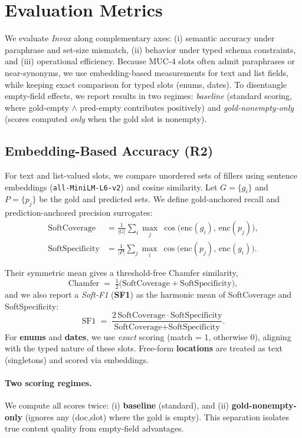 \section{Evaluation Metrics}
\label{sec:eval-metrics}

We evaluate \textit{Invox} along complementary axes: (i) semantic accuracy under paraphrase and set-size mismatch, (ii) behavior under typed schema constraints, and (iii) operational efficiency. 
Because MUC-4 slots often admit paraphrases or near-synonyms, we use embedding-based measurements for text and list fields, while keeping exact comparison for typed slots (enums, dates).
To disentangle empty-field effects, we report results in two regimes:
\emph{baseline} (standard scoring, where gold-empty $\wedge$ pred-empty contributes positively) and 
\emph{gold-nonempty-only} (scores computed \emph{only} when the gold slot is nonempty).

\subsection{Embedding-Based Accuracy (R2)}
\label{subsec:emb-acc}

For text and list-valued slots, we compare unordered sets of fillers using sentence embeddings (\texttt{all-MiniLM-L6-v2}) and cosine similarity. 
Let $G=\{g_i\}$ and $P=\{p_j\}$ be the gold and predicted sets. 
We define gold-anchored recall and prediction-anchored precision surrogates:
\begin{align}
\text{SoftCoverage}   &= \frac{1}{|G|}\sum_{i}\max_{j}\ \cos\!\big(\mathrm{enc}(g_i),\,\mathrm{enc}(p_j)\big), \\
\text{SoftSpecificity} &= \frac{1}{|P|}\sum_{j}\max_{i}\ \cos\!\big(\mathrm{enc}(p_j),\,\mathrm{enc}(g_i)\big).
\end{align}

Their symmetric mean gives a threshold-free Chamfer similarity,
\[
\text{Chamfer} \;=\; \tfrac{1}{2}\big(\text{SoftCoverage}+\text{SoftSpecificity}\big),
\]
and we also report a \emph{Soft-F1} (\textbf{SF1}) as the harmonic mean of SoftCoverage and SoftSpecificity:
\[
\text{SF1} \;=\; \frac{2\,\text{SoftCoverage}\cdot\text{SoftSpecificity}}{\text{SoftCoverage}+\text{SoftSpecificity}}.
\]
For \textbf{enums} and \textbf{dates}, we use \emph{exact} scoring (match = 1, otherwise 0), aligning with the typed nature of these slots. 
Free-form \textbf{locations} are treated as text (singletons) and scored via embeddings.

\paragraph{Two scoring regimes.} 
We compute all scores twice: (i) \textbf{baseline} (standard), and (ii) \textbf{gold-nonempty-only} (ignores any (doc,slot) where the gold is empty). 
This separation isolates true content quality from empty-field advantages.

